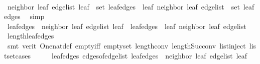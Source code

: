 \begin{isabellebody}
\ \ \isamarkupfalse%
\ \isamarkupfalse%
\ {\isachardoublequoteopen}{\isacharparenleft}{\kern0pt}neighbor\ leaf\ edge{\isacharunderscore}{\kern0pt}list{\isacharcomma}{\kern0pt}\ leaf{\isacharparenright}{\kern0pt}\ {\isasymin}\ set\ {\isacharquery}{\kern0pt}leaf{\isacharunderscore}{\kern0pt}edges\ {\isasymor}\ {\isacharparenleft}{\kern0pt}leaf{\isacharcomma}{\kern0pt}\ neighbor\ leaf\ edge{\isacharunderscore}{\kern0pt}list{\isacharparenright}{\kern0pt}\ {\isasymin}\ set\ {\isacharquery}{\kern0pt}leaf{\isacharunderscore}{\kern0pt}edges{\isachardoublequoteclose}\ \isamarkupfalse%
\ simp\isanewline
\ \ \isamarkupfalse%
\ \isamarkupfalse%
\ {\isachardoublequoteopen}{\isacharquery}{\kern0pt}leaf{\isacharunderscore}{\kern0pt}edges\ {\isacharequal}{\kern0pt}\ {\isacharbrackleft}{\kern0pt}{\isacharparenleft}{\kern0pt}neighbor\ leaf\ edge{\isacharunderscore}{\kern0pt}list{\isacharcomma}{\kern0pt}\ leaf{\isacharparenright}{\kern0pt}{\isacharbrackright}{\kern0pt}\ {\isasymor}\ {\isacharquery}{\kern0pt}leaf{\isacharunderscore}{\kern0pt}edges\ {\isacharequal}{\kern0pt}\ {\isacharbrackleft}{\kern0pt}{\isacharparenleft}{\kern0pt}leaf{\isacharcomma}{\kern0pt}\ neighbor\ leaf\ edge{\isacharunderscore}{\kern0pt}list{\isacharparenright}{\kern0pt}{\isacharbrackright}{\kern0pt}{\isachardoublequoteclose}\ \isamarkupfalse%
\ length{\isacharunderscore}{\kern0pt}leaf{\isacharunderscore}{\kern0pt}edges\isanewline
\ \ \ \ \isamarkupfalse%
\ {\isacharparenleft}{\kern0pt}smt\ {\isacharparenleft}{\kern0pt}verit{\isacharparenright}{\kern0pt}\ One{\isacharunderscore}{\kern0pt}nat{\isacharunderscore}{\kern0pt}def\ empty{\isacharunderscore}{\kern0pt}iff\ empty{\isacharunderscore}{\kern0pt}set\ length{\isacharunderscore}{\kern0pt}{}{\isacharunderscore}{\kern0pt}conv\ length{\isacharunderscore}{\kern0pt}Suc{\isacharunderscore}{\kern0pt}conv\ list{\isachardot}{\kern0pt}inject\ list{\isachardot}{\kern0pt}set{\isacharunderscore}{\kern0pt}cases{\isacharparenright}{\kern0pt}\isanewline
\ \ \isamarkupfalse%
\ \isamarkupfalse%
\ leaf{\isacharunderscore}{\kern0pt}edges{\isacharcolon}{\kern0pt}\ {\isachardoublequoteopen}edges{\isacharunderscore}{\kern0pt}of{\isacharunderscore}{\kern0pt}edge{\isacharunderscore}{\kern0pt}list\ {\isacharquery}{\kern0pt}leaf{\isacharunderscore}{\kern0pt}edges\ {\isacharequal}{\kern0pt}\ {\isacharbraceleft}{\kern0pt}{\isacharbraceleft}{\kern0pt}neighbor\ leaf\ edge{\isacharunderscore}{\kern0pt}list{\isacharcomma}{\kern0pt}\ leaf{\isacharbraceright}{\kern0pt}{\isacharbraceright}{\kern0pt}{\isachardoublequoteclose}\ \isamarkupfalse%

\end{isabellebody}
